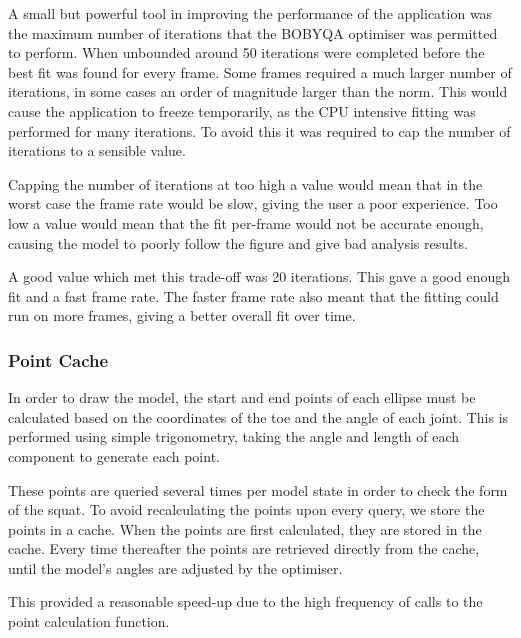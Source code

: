 A small but powerful tool in improving the performance of the application was the maximum number of iterations that the BOBYQA optimiser was permitted to perform. When unbounded around 50 iterations were completed before the best fit was found for every frame. Some frames required a much larger number of iterations, in some cases an order of magnitude larger than the norm. This would cause the application to freeze temporarily, as the CPU intensive fitting was performed for many iterations. To avoid this it was required to cap the number of iterations to a sensible value.

Capping the number of iterations at too high a value would mean that in the worst case the frame rate would be slow, giving the user a poor experience. Too low a value would mean that the fit per-frame would not be accurate enough, causing the model to poorly follow the figure and give bad analysis results.

A good value which met this trade-off was 20 iterations. This gave a good enough fit and a fast frame rate. The faster frame rate also meant that the fitting could run on more frames, giving a better overall fit over time.

\subsubsection{Point Cache}

In order to draw the model, the start and end points of each ellipse must be calculated based on the coordinates of the toe and the angle of each joint. This is performed using simple trigonometry, taking the angle and length of each component to generate each point.

These points are queried several times per model state in order to check the form of the squat. To avoid recalculating the points upon every query, we store the points in a cache. When the points are first calculated, they are stored in the cache. Every time thereafter the points are retrieved directly from the cache, until the model's angles are adjusted by the optimiser.

This provided a reasonable speed-up due to the high frequency of calls to the point calculation function.